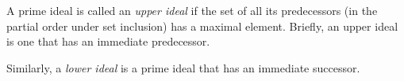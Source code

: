 A prime ideal is called an \emph{upper ideal} if the set of all its predecessors (in the partial order under set inclusion) has a maximal element. Briefly, an upper ideal is one that has an immediate predecessor.

Similarly, a \emph{lower ideal} is a prime ideal that has an immediate successor.
